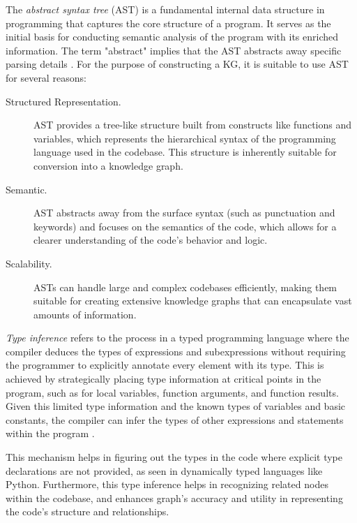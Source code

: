 The \textit{abstract syntax tree} (AST) is a fundamental internal data structure in programming that captures the core structure of a program. It serves as the initial basis for conducting semantic analysis of the program with its enriched information. The term "abstract" implies that the AST abstracts away specific parsing details \cite{Thain_2021}. For the purpose of constructing a KG, it is suitable to use AST for several reasons:  

\begin{description}
  \item[Structured Representation.] AST provides a tree-like structure built from constructs like functions and variables, which represents the hierarchical syntax of the programming language used in the codebase. This structure is inherently suitable for conversion into a knowledge graph.
  \item[Semantic.] AST abstracts away from the surface syntax (such as punctuation and keywords) and focuses on the semantics of the code, which allows for a clearer understanding of the code's behavior and logic.
  \item[Scalability.] ASTs can handle large and complex codebases efficiently, making them suitable for creating extensive knowledge graphs that can encapsulate vast amounts of information.
\end{description}


\textit{Type inference} refers to the process in a typed programming language where the compiler deduces the types of expressions and subexpressions without requiring the programmer to explicitly annotate every element with its type. This is achieved by strategically placing type information at critical points in the program, such as for local variables, function arguments, and function results. Given this limited type information and the known types of variables and basic constants, the compiler can infer the types of other expressions and statements within the program  \cite{Cardelli_1985}. 

This mechanism helps in figuring out the types in the code where explicit type declarations are not provided, as seen in dynamically typed languages like Python. Furthermore, this type inference helps in recognizing related nodes within the codebase, and enhances graph's accuracy and utility in representing the code's structure and relationships.






